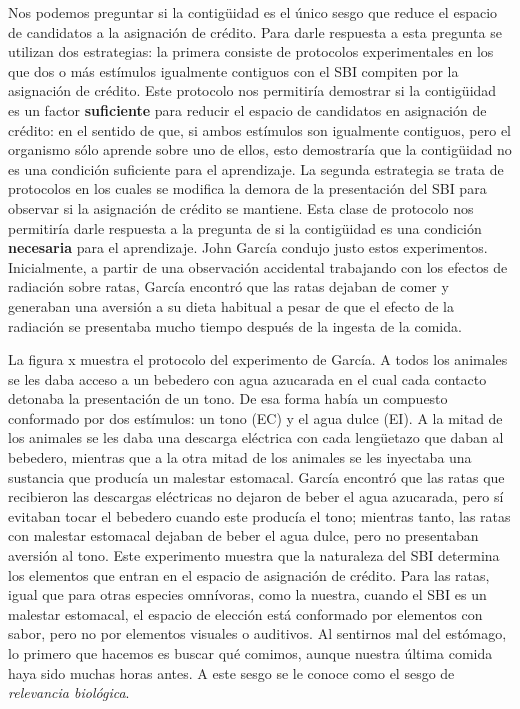\documentclass[
  a4paper,
  DIV=11,
  numbers=noendperiod]{scrreprt}
\begin{document}
Nos podemos preguntar si la contigüidad es el único sesgo que reduce el
espacio de candidatos a la asignación de crédito. Para darle respuesta a
esta pregunta se utilizan dos estrategias: la primera consiste de
protocolos experimentales en los que dos o más estímulos igualmente
contiguos con el SBI compiten por la asignación de crédito. Este
protocolo nos permitiría demostrar si la contigüidad es un factor
\textbf{suficiente} para reducir el espacio de candidatos en asignación
de crédito: en el sentido de que, si ambos estímulos son igualmente
contiguos, pero el organismo sólo aprende sobre uno de ellos, esto
demostraría que la contigüidad no es una condición suficiente para el
aprendizaje. La segunda estrategia se trata de protocolos en los cuales
se modifica la demora de la presentación del SBI para observar si la
asignación de crédito se mantiene. Esta clase de protocolo nos
permitiría darle respuesta a la pregunta de si la contigüidad es una
condición \textbf{necesaria} para el aprendizaje. John García condujo
justo estos experimentos. Inicialmente, a partir de una observación
accidental trabajando con los efectos de radiación sobre ratas, García
encontró que las ratas dejaban de comer y generaban una aversión a su
dieta habitual a pesar de que el efecto de la radiación se presentaba
mucho tiempo después de la ingesta de la comida.

La figura x muestra el protocolo del experimento de García. A todos los
animales se les daba acceso a un bebedero con agua azucarada en el cual
cada contacto detonaba la presentación de un tono. De esa forma había un
compuesto conformado por dos estímulos: un tono (EC) y el agua dulce
(EI). A la mitad de los animales se les daba una descarga eléctrica con
cada lengüetazo que daban al bebedero, mientras que a la otra mitad de
los animales se les inyectaba una sustancia que producía un malestar
estomacal. García encontró que las ratas que recibieron las descargas
eléctricas no dejaron de beber el agua azucarada, pero sí evitaban tocar
el bebedero cuando este producía el tono; mientras tanto, las ratas con
malestar estomacal dejaban de beber el agua dulce, pero no presentaban
aversión al tono. Este experimento muestra que la naturaleza del SBI
determina los elementos que entran en el espacio de asignación de
crédito. Para las ratas, igual que para otras especies omnívoras, como
la nuestra, cuando el SBI es un malestar estomacal, el espacio de
elección está conformado por elementos con sabor, pero no por elementos
visuales o auditivos. Al sentirnos mal del estómago, lo primero que
hacemos es buscar qué comimos, aunque nuestra última comida haya sido
muchas horas antes. A este sesgo se le conoce como el sesgo de
\emph{relevancia biológica}.
\end{document}

